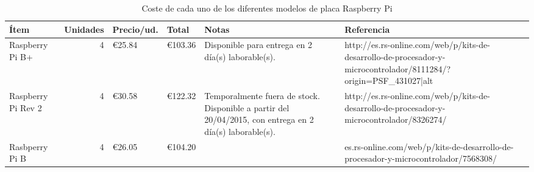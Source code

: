 \begin{landscape}
\begin{table}
\begin{tabular}{|l|r|l|l|p{4.5cm}|p{5cm}|}
\hline
Ítem&Unidades&Precio/ud.&Total&Notas&Referencia\\
\hline
Raspberry Pi B+&4&€25.84&€103.36&Disponible para entrega en 2 día(s) laborable(s).&http://es.rs-online.com/web/p/kits-de-desarrollo-de-procesador-y-microcontrolador/8111284/?origin=PSF\_431027|alt\\
\hline
Raspberry Pi Rev 2&4&€30.58&€122.32&Temporalmente fuera de stock. Disponible a partir del 20/04/2015, con entrega en 2 día(s) laborable(s).&http://es.rs-online.com/web/p/kits-de-desarrollo-de-procesador-y-microcontrolador/8326274/\\
\hline
Rasbperry Pi B&4&€26.05&€104.20&&es.rs-online.com/web/p/kits-de-desarrollo-de-procesador-y-microcontrolador/7568308/\\
\hline
\end{tabular}
\caption{Coste de cada uno de los diferentes modelos de placa Raspberry Pi}
\end{table}
\end{landscape}

